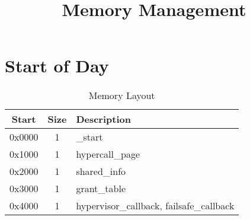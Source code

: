 \documentclass{article}
\title{Memory Management}
\begin{document}
\maketitle

\section{Start of Day}

\begin{table}[htbp]
\caption{Memory Layout}
\begin{tabular}{|c|c|l|}

\hline
Start & Size & Description \\
\hline
0x0000 & 1 & \_start \\
0x1000 & 1 & hypercall\_page \\
0x2000 & 1 & shared\_info \\
0x3000 & 1 & grant\_table \\
0x4000 & 1 & hypervisor\_callback, failsafe\_callback \\
\hline

\end{tabular}
\end{table}
\end{document}
